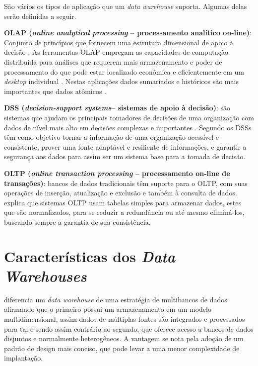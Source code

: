 São vários os tipos de aplicação que um \textit{data warehouse} suporta. Algumas delas serão definidas a seguir.


\textbf{OLAP (\textit{online analytical processing} -- processamento analítico on-line)}:
Conjunto de princípios que fornecem uma estrutura dimensional de apoio à decisão \cite{Kimball2002}. As ferramentas OLAP empregam as capacidades de computação distribuída para análises que requerem mais armazenamento e poder de processamento do que pode estar localizado econômica e eficientemente em um \textit{desktop} individual \cite{elmasri_sistemas_2011}. Nestas aplicações dados sumariados e históricos são mais importantes que dados atômicos \cite{hilmer2002}.

\textbf{DSS (\textit{decision-support systems}-- sistemas de apoio à decisão)}:
são sistemas que ajudam os principais tomadores de decisões de uma organização com dados de nível mais alto em decisões complexas e importantes \cite{elmasri_sistemas_2011}. Segundo   os DSSs têm como objetivo tornar a informação de uma organização acessível e consistente, prover uma fonte adaptável e resiliente de informações, e garantir a segurança aos dados para assim ser um sistema base para a tomada de decisão.

\textbf{OLTP (\textit{online transaction processing} -- processamento on-line de transações)}:
bancos de dados tradicionais têm suporte para o OLTP, com suas operações de inserção, atualização e exclusão e também à consulta de dados.  explica que sistemas OLTP usam tabelas simples para armazenar dados, estes que são normalizados, para se reduzir a redundância ou até mesmo eliminá-los, buscando sempre a garantia de sua consistência.

\section{Características dos \textit{Data Warehouses}}\label{sec:caract-dw}


 diferencia um \textit{data warehouse} de uma estratégia de multibancos de dados afirmando que o primeiro possui um armazenamento em um modelo multidimensional, assim dados de múltiplas fontes são integrados e processados para tal e sendo assim contrário ao segundo, que oferece acesso a bancos de dados disjuntos e normalmente heterogêneos. A vantagem se nota pela adoção de um padrão de design mais conciso, que pode levar a uma menor complexidade de implantação.

